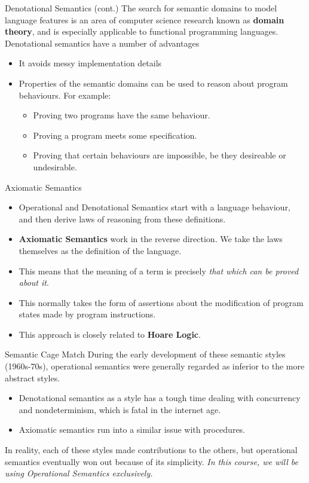 \documentclass[11pt]{beamer}
\begin{document}
\begin{frame}[fragile=singleslide]{Denotational Semantics (cont.)}
The search for semantic domains to model language features is an area of computer science research known as \textbf{domain theory}, and is especially applicable to functional programming languages. \\
\vspace{1em}
Denotational semantics have a number of advantages
\begin{itemize}
\item It avoids messy implementation details
\item Properties of the semantic domains can be used to reason about program behaviours. For example:
\begin{itemize}
\item Proving two programs have the same behaviour.
\item Proving a program meets some specification.
\item Proving that certain behaviours are impossible, be they desireable or undesirable.
\end{itemize}
\end{itemize}
\end{frame}

\begin{frame}[fragile=singleslide]{Axiomatic Semantics}
\begin{itemize}
\item Operational and Denotational Semantics start with a language behaviour, and then derive laws of reasoning from these definitions.  
\item \textbf{Axiomatic Semantics} work in the reverse direction.  We take the laws themselves as the definition of the language.
\item This means that the meaning of a term is precisely \emph{that which can be proved about it}.  
\item This normally takes the form of assertions about the modification of program states made by program instructions.
\item This approach is closely related to \textbf{Hoare Logic}. 
\end{itemize}
\end{frame}

\begin{frame}[fragile=singleslide]{Semantic Cage Match}
During the early development of these semantic styles (1960s-70s), operational semantics were generally regarded as inferior to the more abstract styles.  
\begin{itemize}
\item Denotational semantics as a style has a tough time dealing with concurrency and nondeterminism, which is fatal in the internet age.
\item Axiomatic semantics run into a similar issue with procedures.  
\end{itemize}
In reality, each of these styles made contributions to the others, but operational semantics eventually won out because of its simplicity.  \emph{In this course, we will be using Operational Semantics exclusively.}
\end{frame}
\end{document}
